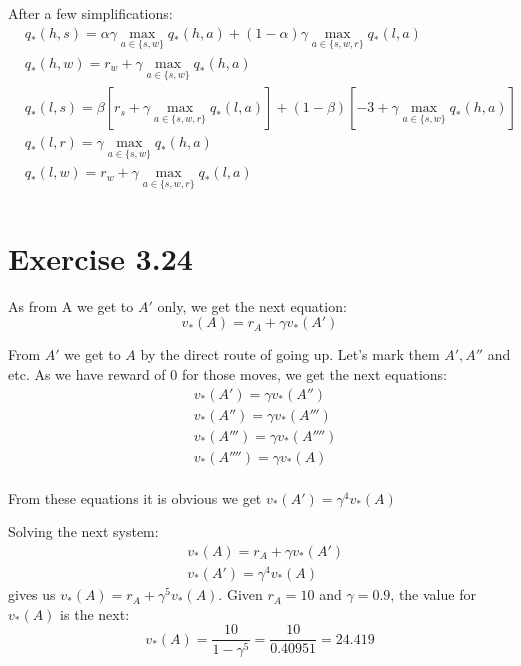\documentclass[12pt, a4paper]{article}
\begin{document}
        After a few simplifications:
        \begin{align*}
            &q_*(h,s) = \alpha \gamma \max\limits_{a \in \{s, w\}} q_*(h, a) +
            (1 - \alpha) \gamma \max\limits_{a \in \{s, w, r\}} q_*(l, a)\\
            &q_*(h,w) = r_w + \gamma \max\limits_{a \in \{s, w\}} q_*(h, a)\\
            &q_*(l,s) = \beta [r_s + \gamma \max\limits_{a \in \{s, w, r\}} q_*(l, a)] +
            (1 - \beta) [-3 + \gamma \max\limits_{a \in \{s, w\}} q_*(h, a)]\\
            &q_*(l,r) = \gamma \max\limits_{a \in \{s, w\}} q_*(h, a)\\
            &q_*(l,w) = r_w + \gamma \max\limits_{a \in \{s, w, r\}} q_*(l, a)\\
        \end{align*}

    \section{Exercise 3.24}
        As from A we get to $A'$ only, we get the next equation:
        $$v_*(A) = r_A + \gamma v_*(A')$$

        From $A'$ we get to $A$ by the direct route of going up. Let's mark them
        $A', A''$ and etc. As we have reward of 0 for those moves, we get the next
        equations:
        \begin{align*}
            &v_*(A') = \gamma v_*(A'')\\
            &v_*(A'') = \gamma v_*(A''')\\
            &v_*(A''') = \gamma v_*(A'''')\\
            &v_*(A'''') = \gamma v_*(A)\\
        \end{align*}

        From these equations it is obvious we get $v_*(A') = \gamma^4 v_*(A)$

        Solving the next system:
        \begin{align*}
        &v_*(A) = r_A + \gamma v_*(A')\\
        &v_*(A') = \gamma^4 v_*(A)
        \end{align*}
        gives us $v_*(A) = r_A + \gamma^5 v_*(A)$. Given $r_A = 10$ and $\gamma = 0.9$,
        the value for $v_*(A)$ is the next:
        $$v_*(A) = \frac{10}{1 - \gamma^5} = \frac{10}{0.40951} = 24.419$$
\end{document}
